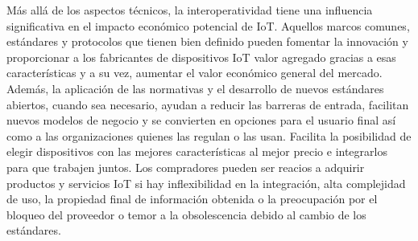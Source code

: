 Más allá de los aspectos técnicos, la interoperatividad tiene una influencia significativa en el impacto económico potencial de IoT. Aquellos marcos comunes, estándares y protocolos que tienen bien definido pueden fomentar la innovación y proporcionar a los fabricantes de dispositivos IoT valor agregado gracias a esas características y a su vez, aumentar el valor económico general del mercado.\\

Además, la aplicación de las normativas y el desarrollo de nuevos estándares abiertos, cuando sea necesario, ayudan a reducir las barreras de entrada, facilitan nuevos modelos de negocio y se convierten en opciones para el usuario final así como a las organizaciones quienes las regulan o las usan. Facilita la posibilidad de elegir dispositivos con las mejores características al mejor precio e integrarlos para que trabajen juntos. Los compradores pueden ser reacios a adquirir productos y servicios IoT si hay inflexibilidad en la integración, alta complejidad de uso, la propiedad final de información obtenida o la preocupación por el bloqueo del proveedor o temor a la obsolescencia debido al cambio de los estándares\cite{iotInternetSociety}.\\

